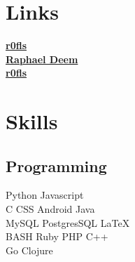 \documentclass[]{deemweaver}
\begin{document}
%
%
\lastupdated

%
%


%
%

\begin{minipage}[t]{0.33\textwidth} 


\section{Links} 
{\FA \faGithub} \href{https://github.com/r0fls}{\bf r0fls} \\
{\FA \faLinkedin} \href{https://www.linkedin.com/in/raphael-deem-5757ba31}{\bf Raphael Deem} \\
{\FA \faStackOverflow}  \href{http://stackoverflow.com/users/1318734/rofls}{\bf r0fls} \\


\section{Skills}
\subsection{Programming}
Python \textbullet{} Javascript \\
C \textbullet{} CSS \textbullet{} Android \textbullet{} Java \\
MySQL \textbullet{} PostgresSQL \textbullet{} \LaTeX\ \\
BASH \textbullet{} Ruby \textbullet{} PHP \textbullet{} C++ \\ 
Go \textbullet{} Clojure
\sectionsep




\end{minipage}
\end{document}
